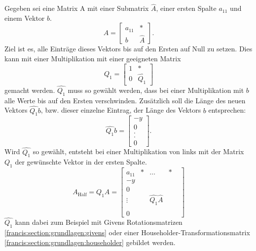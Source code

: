 Gegeben sei eine Matrix A mit einer Submatrix $\hat{A}$, einer ersten Spalte $a_{11}$ und einem Vektor $b$.
\begin{equation}
A=
\begin{bmatrix}
a_{11} & *\\
b & \hat{A}
\end{bmatrix}.
\end{equation}
Ziel ist es, alle Einträge dieses Vektors bis auf den Ersten auf Null zu setzen.
Dies kann mit einer Multiplikation mit einer geeigneten Matrix
\begin{equation}
Q_{1}=
\begin{bmatrix}
	1 & *\\
	0 & \hat{Q_1}
\end{bmatrix}
\end{equation}
gemacht werden.
$\hat{Q_1}$ muss so gewählt werden, dass bei einer Multiplikation mit $b$ alle Werte bis auf den Ersten verschwinden.
Zusätzlich soll die Länge des neuen Vektors $\hat{Q_1}b$, bzw. dieser einzelne Eintrag, der Länge des Vektors $b$ entsprechen:
\begin{equation}
\hat{Q_1}b=
\begin{bmatrix}
-y\\
0\\
.\\
.\\
0
\end{bmatrix}.
\end{equation}
Wird $\hat{Q_1}$ so gewählt, entsteht bei einer Multiplikation von links mit der Matrix $Q_1$ der gewünschte Vektor in der ersten Spalte.
\begin{equation}
A_{\text{Half}}=Q_{1}A=
\begin{bmatrix}
a_{11} & * & \dots & *\\
-y & \\
0 & & & &\\
\vdots & &\hat{Q_1}\hat{A} & &\\
 & & & &\\
0 & & & &
\end{bmatrix}
\end{equation}
$\hat{Q_1}$ kann dabei zum Beispiel mit Givens Rotationsmatrizen \ref{francis:section:grundlagen:givens} oder einer Householder-Transformationsmatrix \ref{francis:section:grundlagen:householder} gebildet werden.

